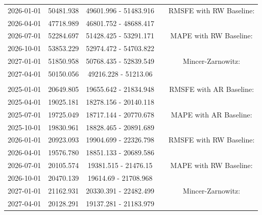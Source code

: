 \begin{table}
\begin{tabular}[t]{ccccc}
\hspace{1em}2026-01-01 & 50481.938 & 49601.996 - 51483.916 &  & RMSFE with RW Baseline:\\
\hspace{1em}2026-04-01 & 47718.989 & 46801.752 - 48688.417 &  & \\
\hspace{1em}2026-07-01 & 52284.697 & 51428.425 - 53291.171 &  & MAPE with RW Baseline:\\
\hspace{1em}2026-10-01 & 53853.229 & 52974.472 - 54703.822 &  & \\
\hspace{1em}2027-01-01 & 51850.958 & 50768.435 - 52839.549 &  & Mincer-Zarnowitz:\\
\hspace{1em}2027-04-01 & 50150.056 & 49216.228 - 51213.06 &  & \\
\addlinespace[0.3em]
\multicolumn{5}{l}{\textbf{RealVAIndustry}}\\
\hspace{1em}2025-01-01 & 20649.805 & 19655.642 - 21834.948 &  & RMSFE with AR Baseline:\\
\hspace{1em}2025-04-01 & 19025.181 & 18278.156 - 20140.118 &  & \\
\hspace{1em}2025-07-01 & 19725.049 & 18717.144 - 20770.678 &  & MAPE with AR Baseline:\\
\hspace{1em}2025-10-01 & 19830.961 & 18828.465 - 20891.689 &  & \\
\hspace{1em}2026-01-01 & 20923.093 & 19904.699 - 22326.798 &  & RMSFE with RW Baseline:\\
\hspace{1em}2026-04-01 & 19576.780 & 18851.133 - 20689.586 &  & \\
\hspace{1em}2026-07-01 & 20105.574 & 19381.515 - 21476.15 &  & MAPE with RW Baseline:\\
\hspace{1em}2026-10-01 & 20470.139 & 19614.69 - 21708.968 &  & \\
\hspace{1em}2027-01-01 & 21162.931 & 20330.391 - 22482.499 &  & Mincer-Zarnowitz:\\
\hspace{1em}2027-04-01 & 20128.291 & 19137.281 - 21183.979 &  & \\
\bottomrule
\end{tabular}
\end{table}

